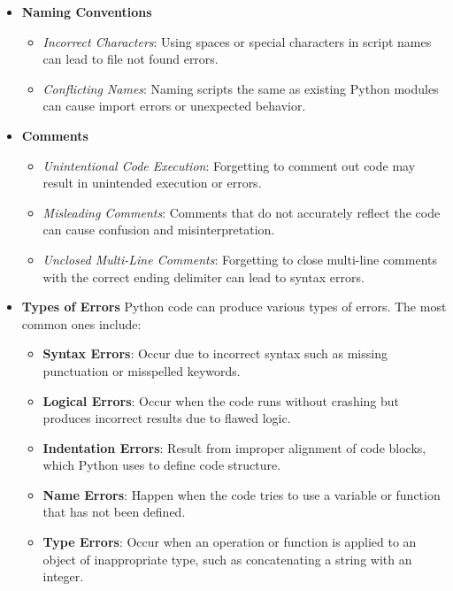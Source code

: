 \begin{itemize}
    \item \textbf{Naming Conventions}
    \begin{itemize}
        \item \textit{Incorrect Characters}: Using spaces or special characters in script names can lead to file not found errors.
        \item \textit{Conflicting Names}: Naming scripts the same as existing Python modules can cause import errors or unexpected behavior.
    \end{itemize}

    \item \textbf{Comments}
    \begin{itemize}
        \item \textit{Unintentional Code Execution}: Forgetting to comment out code may result in unintended execution or errors.
        \item \textit{Misleading Comments}: Comments that do not accurately reflect the code can cause confusion and misinterpretation.
        \item \textit{Unclosed Multi-Line Comments}: Forgetting to close multi-line comments with the correct ending delimiter can lead to syntax errors.
    \end{itemize}

    \item \textbf{Types of Errors}
    Python code can produce various types of errors. The most common ones include:

    \begin{itemize}
        \item \textbf{Syntax Errors}: Occur due to incorrect syntax such as missing punctuation or misspelled keywords.
        \item \textbf{Logical Errors}: Occur when the code runs without crashing but produces incorrect results due to flawed logic.
        \item \textbf{Indentation Errors}: Result from improper alignment of code blocks, which Python uses to define code structure.
        \item \textbf{Name Errors}: Happen when the code tries to use a variable or function that has not been defined.
        \item \textbf{Type Errors}: Occur when an operation or function is applied to an object of inappropriate type, such as concatenating a string with an integer.
    \end{itemize}

\end{itemize}

